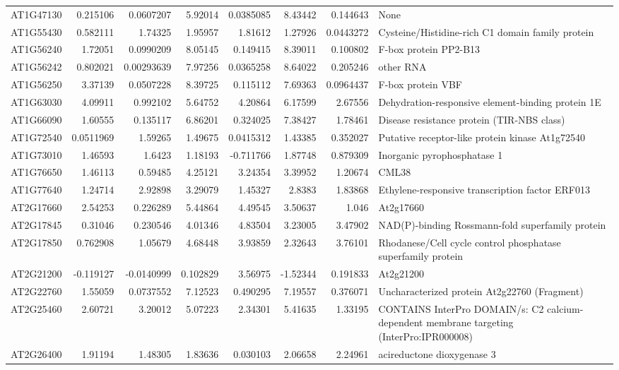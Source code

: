 \documentclass[11pt]{article}
\begin{document}
\begin{center}
\begin{tabular}{lrrrrrrl}
AT1G47130 & 0.215106 & 0.0607207 & 5.92014 & 0.0385085 & 8.43442 & 0.144643 & None\\
AT1G55430 & 0.582111 & 1.74325 & 1.95957 & 1.81612 & 1.27926 & 0.0443272 & Cysteine/Histidine-rich C1 domain family protein\\
AT1G56240 & 1.72051 & 0.0990209 & 8.05145 & 0.149415 & 8.39011 & 0.100802 & F-box protein PP2-B13\\
AT1G56242 & 0.802021 & 0.00293639 & 7.97256 & 0.0365258 & 8.64022 & 0.205246 & other RNA\\
AT1G56250 & 3.37139 & 0.0507228 & 8.39725 & 0.115112 & 7.69363 & 0.0964437 & F-box protein VBF\\
AT1G63030 & 4.09911 & 0.992102 & 5.64752 & 4.20864 & 6.17599 & 2.67556 & Dehydration-responsive element-binding protein 1E\\
AT1G66090 & 1.60555 & 0.135117 & 6.86201 & 0.324025 & 7.38427 & 1.78461 & Disease resistance protein (TIR-NBS class)\\
AT1G72540 & 0.0511969 & 1.59265 & 1.49675 & 0.0415312 & 1.43385 & 0.352027 & Putative receptor-like protein kinase At1g72540\\
AT1G73010 & 1.46593 & 1.6423 & 1.18193 & -0.711766 & 1.87748 & 0.879309 & Inorganic pyrophosphatase 1\\
AT1G76650 & 1.46113 & 0.59485 & 4.25121 & 3.24354 & 3.39952 & 1.20674 & CML38\\
AT1G77640 & 1.24714 & 2.92898 & 3.29079 & 1.45327 & 2.8383 & 1.83868 & Ethylene-responsive transcription factor ERF013\\
AT2G17660 & 2.54253 & 0.226289 & 5.44864 & 4.49545 & 3.50637 & 1.046 & At2g17660\\
AT2G17845 & 0.31046 & 0.230546 & 4.01346 & 4.83504 & 3.23005 & 3.47902 & NAD(P)-binding Rossmann-fold superfamily protein\\
AT2G17850 & 0.762908 & 1.05679 & 4.68448 & 3.93859 & 2.32643 & 3.76101 & Rhodanese/Cell cycle control phosphatase superfamily protein\\
AT2G21200 & -0.119127 & -0.0140999 & 0.102829 & 3.56975 & -1.52344 & 0.191833 & At2g21200\\
AT2G22760 & 1.55059 & 0.0737552 & 7.12523 & 0.490295 & 7.19557 & 0.376071 & Uncharacterized protein At2g22760 (Fragment)\\
AT2G25460 & 2.60721 & 3.20012 & 5.07223 & 2.34301 & 5.41635 & 1.33195 & CONTAINS InterPro DOMAIN/s: C2 calcium-dependent membrane targeting (InterPro:IPR000008)\\
AT2G26400 & 1.91194 & 1.48305 & 1.83636 & 0.030103 & 2.06658 & 2.24961 & acireductone dioxygenase 3\\

\end{tabular}
\end{center}
\end{document}
